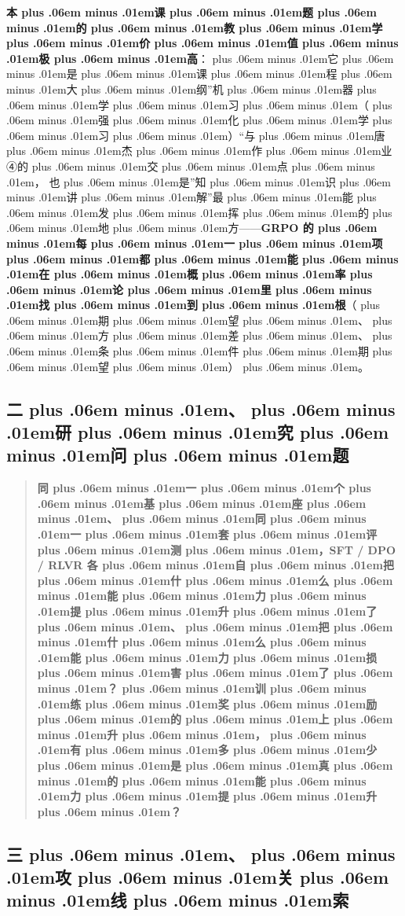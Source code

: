 \documentclass[
]{article}
\def\zh#1{{\zhfont #1}}
\def\sym#1{{\symfont #1}}
\def\zhglue{\hskip0pt plus .06em minus .01em}
\begin{document}
\textbf{\zh{本\zhglue 课\zhglue 题\zhglue 的\zhglue 教\zhglue 学\zhglue 价\zhglue 值\zhglue 极\zhglue 高}}\zh{：\zhglue 它\zhglue 是\zhglue 课\zhglue 程\zhglue 大\zhglue 纲}''\zh{机\zhglue 器\zhglue 学\zhglue 习\zhglue （\zhglue 强\zhglue 化\zhglue 学\zhglue 习\zhglue ）}``\zh{与\zhglue 唐\zhglue 杰\zhglue 作\zhglue 业}\sym{④}\zh{的\zhglue 交\zhglue 点\zhglue ，} \zh{也\zhglue 是}''\zh{知\zhglue 识\zhglue 讲\zhglue 解}''\zh{最\zhglue 能\zhglue 发\zhglue 挥\zhglue 的\zhglue 地\zhglue 方}------\textbf{GRPO \zh{的\zhglue 每\zhglue 一\zhglue 项\zhglue 都\zhglue 能\zhglue 在\zhglue 概\zhglue 率\zhglue 论\zhglue 里\zhglue 找\zhglue 到\zhglue 根}}\zh{（\zhglue 期\zhglue 望\zhglue 、\zhglue 方\zhglue 差\zhglue 、\zhglue 条\zhglue 件\zhglue 期\zhglue 望\zhglue ）\zhglue 。}

\subsection{\zh{二\zhglue 、\zhglue 研\zhglue 究\zhglue 问\zhglue 题}}\label{ux4e8cux7814ux7a76ux95eeux9898-2}

\begin{quote}
\textbf{\zh{同\zhglue 一\zhglue 个\zhglue 基\zhglue 座\zhglue 、\zhglue 同\zhglue 一\zhglue 套\zhglue 评\zhglue 测\zhglue ，}SFT / DPO / RLVR \zh{各\zhglue 自\zhglue 把\zhglue 什\zhglue 么\zhglue 能\zhglue 力\zhglue 提\zhglue 升\zhglue 了\zhglue 、\zhglue 把\zhglue 什\zhglue 么\zhglue 能\zhglue 力\zhglue 损\zhglue 害\zhglue 了\zhglue ？\zhglue 训\zhglue 练\zhglue 奖\zhglue 励\zhglue 的\zhglue 上\zhglue 升\zhglue ，\zhglue 有\zhglue 多\zhglue 少\zhglue 是\zhglue 真\zhglue 的\zhglue 能\zhglue 力\zhglue 提\zhglue 升\zhglue ？}}
\end{quote}

\subsection{\zh{三\zhglue 、\zhglue 攻\zhglue 关\zhglue 线\zhglue 索}}\label{ux4e09ux653bux5173ux7ebfux7d22-6}
\end{document}
